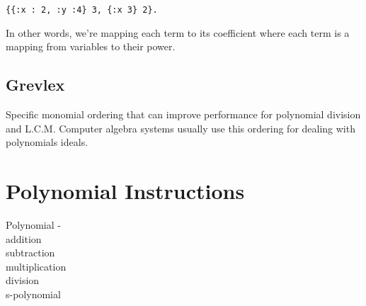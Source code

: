 \documentclass[20pt]{extarticle}
\begin{document}
\begin{verbatim}
{{:x : 2, :y :4} 3, {:x 3} 2}.
\end{verbatim}

In other words, we're mapping each term to its coefficient where each term is a mapping from variables to their power.

\subsection*{Grevlex}

Specific monomial ordering that can improve performance for polynomial division and L.C.M.
Computer algebra systems usually use this ordering for dealing with polynomials ideals.


\newpage
\section*{Polynomial Instructions}

Polynomial - \\
\indent addition \\
\indent subtraction     \\   
\indent multiplication \\
\indent division \\
\indent s-polynomial \\
\end{document}

